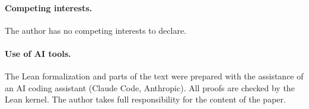 \paragraph{Competing interests.} The author has no competing interests to declare.

\paragraph{Use of AI tools.} The Lean formalization and parts of the text were prepared with the
assistance of an AI coding assistant (Claude Code, Anthropic). All proofs are checked by the Lean
kernel. The author takes full responsibility for the content of the paper.
